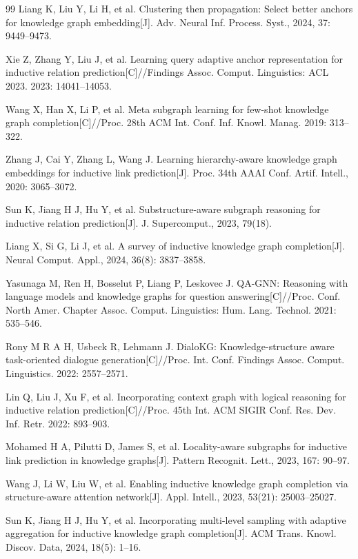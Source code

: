 \documentclass[preprint,12pt]{elsarticle}
\begin{document}
\begin{thebibliography}{99}
Liang K, Liu Y, Li H, et al.
Clustering then propagation: Select better anchors for knowledge graph embedding[J]. Adv. Neural Inf. Process. Syst., 2024, 37: 9449--9473.

Xie Z, Zhang Y, Liu J, et al.
Learning query adaptive anchor representation for inductive relation prediction[C]//Findings Assoc. Comput. Linguistics: ACL 2023.
2023: 14041--14053.

Wang X, Han X, Li P, et al.
Meta subgraph learning for few-shot knowledge graph completion[C]//Proc. 28th ACM Int. Conf. Inf. Knowl. Manag.
2019: 313--322.

Zhang J, Cai Y, Zhang L, Wang J.
Learning hierarchy-aware knowledge graph embeddings for inductive link prediction[J].
Proc. 34th AAAI Conf. Artif. Intell., 2020: 3065--3072.

Sun K, Jiang H J, Hu Y, et al.
Substructure-aware subgraph reasoning for inductive relation prediction[J]. J. Supercomput., 2023, 79(18).

Liang X, Si G, Li J, et al.
A survey of inductive knowledge graph completion[J]. Neural Comput. Appl., 2024, 36(8): 3837--3858.

Yasunaga M, Ren H, Bosselut P, Liang P, Leskovec J.
QA-GNN: Reasoning with language models and knowledge graphs for question answering[C]//Proc. Conf. North Amer. Chapter Assoc. Comput. Linguistics: Hum. Lang. Technol.
2021: 535--546.

Rony M R A H, Usbeck R, Lehmann J.
DialoKG: Knowledge-structure aware task-oriented dialogue generation[C]//Proc. Int. Conf. Findings Assoc. Comput. Linguistics.
2022: 2557--2571.

Lin Q, Liu J, Xu F, et al.
Incorporating context graph with logical reasoning for inductive relation prediction[C]//Proc. 45th Int. ACM SIGIR Conf. Res. Dev. Inf. Retr.
2022: 893--903.

Mohamed H A, Pilutti D, James S, et al.
Locality-aware subgraphs for inductive link prediction in knowledge graphs[J]. Pattern Recognit. Lett., 2023, 167: 90--97.

Wang J, Li W, Liu W, et al.
Enabling inductive knowledge graph completion via structure-aware attention network[J]. Appl. Intell., 2023, 53(21): 25003--25027.

Sun K, Jiang H J, Hu Y, et al.
Incorporating multi-level sampling with adaptive aggregation for inductive knowledge graph completion[J]. ACM Trans. Knowl. Discov. Data, 2024, 18(5): 1--16.


\end{thebibliography}
\end{document}

